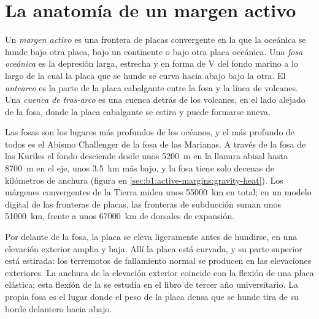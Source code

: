 \section{La anatomía de un margen activo}\label{sec:b1:active-margins:anatomy}

\begin{definition}\label{def:b1:active-margins:active-margin}
Un \emph{margen activo} es una frontera de placas convergente en la que la  oceánica se hunde bajo otra placa,
bajo un continente o bajo otra placa oceánica. Una \emph{fosa oceánica} es la depresión larga, estrecha y en forma de V
del fondo marino a lo largo de la cual la placa que se hunde se curva hacia abajo bajo la otra. El \emph{antearco} es la parte
de la placa cabalgante entre la fosa y la línea de volcanes. Una \emph{cuenca de tras-arco} es una cuenca detrás de
los volcanes, en el lado alejado de la fosa, donde la placa cabalgante se estira y puede formarse  nueva.
\end{definition}

Las fosas son los lugares más profundos de los océanos, y el más profundo de todos es el Abismo Challenger de la fosa de las Marianas. A
través de la fosa de las Kuriles el fondo desciende desde unos \qty{5200}{m} en la llanura abisal hasta \qty{8700}{m} en el eje, unos
\qty{3.5}{km} más bajo, y la fosa tiene solo decenas de kilómetros de anchura (figura en \cref{sec:b1:active-margins:gravity-heat}). Los
márgenes convergentes de la Tierra miden unos \qty{55000}{km} en total; en un modelo digital de las fronteras de placas, las fronteras de
subducción suman unos \qty{51000}{km}, frente a unos \qty{67000}{km} de dorsales de expansión.

Por delante de la fosa, la placa se eleva ligeramente antes de hundirse, en una elevación exterior amplia y baja. Allí la placa está curvada,
y su parte superior está estirada: los terremotos de fallamiento normal se producen en las elevaciones exteriores. La anchura de la elevación
exterior coincide con la flexión de una placa elástica; esta flexión de la  se estudia en el libro de tercer año universitario. La
propia fosa es el lugar donde el peso de la placa densa que se hunde tira de su borde delantero hacia abajo.

